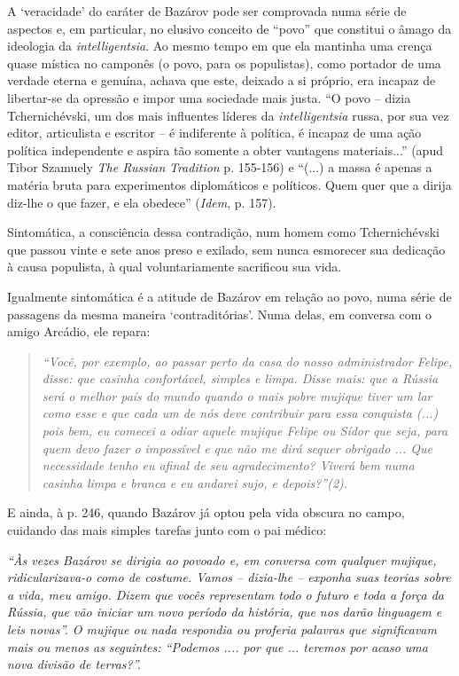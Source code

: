 A `veracidade' do caráter de Bazárov pode ser comprovada numa série de
aspectos e, em particular, no elusivo conceito de ``povo'' que constitui
o âmago da ideologia da \emph{intelligentsia}. Ao mesmo tempo em que ela
mantinha uma crença quase mística no camponês (o povo, para os
populistas), como portador de uma verdade eterna e genuína, achava que
este, deixado a si próprio, era incapaz de libertar-se da opressão e
impor uma sociedade mais justa. ``O povo -- dizia Tchernichévski, um dos
mais influentes líderes da \emph{intelligentsia} russa, por sua vez
editor, articulista e escritor -- é indiferente à política, é incapaz de
uma ação política independente e aspira tão somente a obter vantagens
materiais...'' (apud Tibor Szamuely \emph{The Russian} { }
\emph{Tradition} p. 155-156) e ``(...) a massa é apenas a matéria bruta
para experimentos diplomáticos e políticos. Quem quer que a dirija
diz-lhe o que fazer, e ela obedece'' (\emph{Idem}, p. 157).

Sintomática, a consciência dessa contradição, num homem como
Tchernichévski que passou vinte e sete anos preso e exilado, sem nunca
esmorecer sua dedicação à causa populista, à qual voluntariamente
sacrificou sua vida.

Igualmente sintomática é a atitude de Bazárov em relação ao povo, numa
série de passagens da mesma maneira `contraditórias'. Numa delas, em
conversa com o amigo Arcádio, ele repara:

\begin{quote}
\emph{``Você, por exemplo, ao passar perto da casa do nosso
administrador Felipe, disse: que casinha confortável, simples e limpa.
Disse mais: que a Rússia será o melhor país do mundo quando o mais pobre
mujique tiver um lar como esse e que cada um de nós deve contribuir para
essa conquista (...) pois bem, eu comecei a odiar aquele mujique Felipe
ou Sídor que seja, para quem devo fazer o impossível e que não me dirá
sequer obrigado ... Que necessidade tenho eu afinal de seu
agradecimento? Viverá bem numa casinha limpa e branca e eu andarei sujo,
e depois?''(2). }
\end{quote}

E ainda, à p. 246, quando Bazárov já optou pela vida obscura no campo,
cuidando das mais simples tarefas junto com o pai médico:

\emph{``Às vezes Bazárov se dirigia ao povoado e, em conversa com
qualquer mujique, ridicularizava-o como de costume. Vamos -- dizia-lhe
-- exponha suas teorias sobre a vida, meu amigo. Dizem que vocês
representam todo o futuro e toda a força da Rússia, que vão iniciar um
novo período da história, que nos darão linguagem e leis novas''. O
mujique ou nada respondia ou proferia palavras que significavam mais ou
menos as seguintes: ``Podemos .... por que ... teremos por acaso uma
nova divisão de terras?''.}

